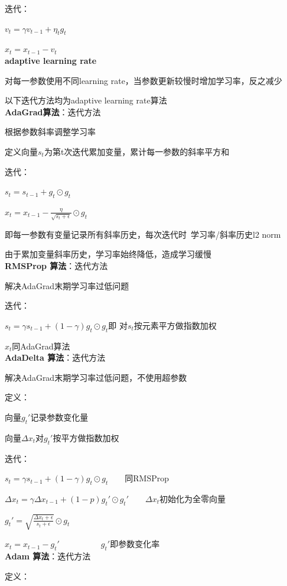 \documentclass[UTF8]{ctexart}
\begin{document}
  迭代：

  \quad $v_t = \gamma v_{t-1} + \eta_t g_t$

  \quad $x_t = x_{t-1} - v_t$\\
\textbf{adaptive learning rate}

  对每一参数使用不同learning rate，当参数更新较慢时增加学习率，反之减少
  
  以下迭代方法均为adaptive learning rate算法\\
\textbf{AdaGrad算法}：迭代方法

  根据参数斜率调整学习率

  定义向量$s_t$为第t次迭代累加变量，累计每一参数的斜率平方和

  迭代：

  \quad $s_t = s_{t-1} + g_t \odot g_t$

  \quad $x_t = x_{t-1} - \frac{\eta}{\sqrt{s_t + \epsilon } } \odot g_t$

  \quad \quad 即每一参数有变量记录所有斜率历史，每次迭代时\ 学习率/斜率历史l2 norm

  由于累加变量斜率历史，学习率始终降低，造成学习缓慢\\
\textbf{RMSProp 算法}：迭代方法

  解决AdaGrad末期学习率过低问题

  迭代：
  
  \quad $s_t = \gamma s_{t-1} + (1-\gamma)g_t \odot g_t$即 对$s_t$按元素平方做指数加权

  \quad $x_t$同AdaGrad算法\\
\textbf{AdaDelta 算法}：迭代方法

  解决AdaGrad末期学习率过低问题，不使用超参数

  定义：

  \quad 向量$g_t'$记录参数变化量

  \quad 向量$\varDelta x_t$对$g_t'$按平方做指数加权

  迭代：

  \quad $s_t = \gamma s_{t-1} + (1-\gamma)g_t \odot g_t$\ \ \ \ 同RMSProp

  \quad $\varDelta x_t = \gamma \varDelta x_{t-1} + (1-p)g_t' \odot g_t'$\ \ \ \ $\varDelta x_t$初始化为全零向量

  \quad $g_t' = \sqrt{\frac{\varDelta x_t + \epsilon }{s_t + \epsilon }} \odot g_t $

  \quad $x_t = x_{t-1} - g_t'$\ \ \ \ \ \ \ \ \ \ $g_t'$即参数变化率\\
\textbf{Adam 算法}：迭代方法

  定义：
\end{document}
